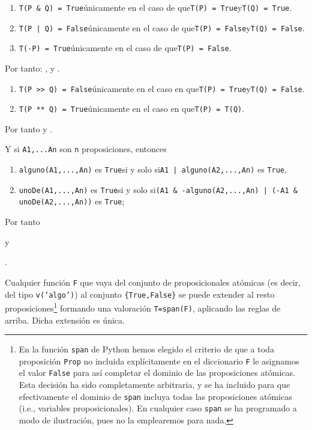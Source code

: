 \documentclass[10pt,a4paper]{report}
\begin{document}
\begin{enumerate}
\item \texttt{T(P \& Q) = True}\quad únicamente en el caso de que\quad \texttt{T(P) = True}\quad y\quad \texttt{T(Q) = True}.
\item \texttt{T(P | Q) = False}\quad únicamente en el caso de que\quad \texttt{T(P) = False}\quad y\quad \texttt{T(Q) = False}.
\item \texttt{T(-P) = True}\quad únicamente en el caso de que\quad \texttt{T(P) = False}.
\end{enumerate}
Por tanto:  
,\qquad  
{}\quad y \quad 
{}.
\begin{enumerate}
\item \texttt{T(P >{}>{} Q) = False}\quad únicamente en el caso en que\quad \texttt{T(P) = True}\quad y\quad \texttt{T(Q) = False}.
\item \texttt{T(P ** Q) = True}\quad únicamente en el caso en que\quad \texttt{T(P) = T(Q)}.
\end{enumerate}
Por tanto\quad 
{}
\quad y\quad 
{}.

Y si \texttt{A1,...An} son \texttt{n} proposiciones, entonces
\begin{enumerate}
\item \texttt{alguno(A1,...,An)} es \texttt{True}\quad si y solo si\quad \texttt{A1 | alguno(A2,...,An)} es \texttt{True},
\item \texttt{unoDe(A1,...,An)} es \texttt{True}\quad si y solo si\quad \texttt{(A1 \& -alguno(A2,...,An) | (-A1 \& unoDe(A2,...,An))} es \texttt{True};
\end{enumerate}
Por tanto
\begin{center}
\end{center}
y
\begin{center}
.
\end{center}
Cualquier función \texttt{F} que vaya del conjunto de proposicionales atómicas (es decir, del tipo \texttt{v('algo')}) al conjunto \texttt{\{True,False\}} 
se puede extender al resto proposiciones\footnote{En la función \texttt{span} de Python hemos elegido el criterio de que a toda proposición \texttt{Prop} no incluida explícitamente en el diccionario \texttt{F} le asignamos el valor \texttt{False} para así completar el dominio de las proposiciones atómicas. 
Esta decisión ha sido completamente arbitraria, y se ha incluido para que efectivamente el dominio de \texttt{span} incluya todas las proposiciones atómicas (i.e., variables proposicionales). 
En cualquier caso \texttt{span} se ha programado a modo de ilustración, pues no la emplearemos para nada.}
formando una valoración \texttt{T=span(F)}, aplicando las reglas de arriba. 
Dicha extensión es única.
\end{document}
